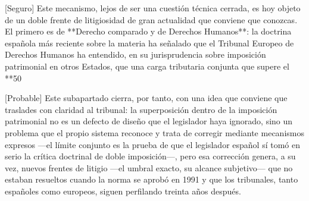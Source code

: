 \documentclass[10pt,a4paper]{article}
\begin{document}
[Seguro] Este mecanismo, lejos de ser una cuestión técnica cerrada, es hoy objeto de un doble frente de litigiosidad de gran actualidad que conviene que conozcas. El primero es de **Derecho comparado y de Derechos Humanos**: la doctrina española más reciente sobre la materia ha señalado que el Tribunal Europeo de Derechos Humanos ha entendido, en su jurisprudencia sobre imposición patrimonial en otros Estados, que una carga tributaria conjunta que supere el **50%

[Probable] Este subapartado cierra, por tanto, con una idea que conviene que traslades con claridad al tribunal: la superposición dentro de la imposición patrimonial no es un defecto de diseño que el legislador haya ignorado, sino un problema que el propio sistema reconoce y trata de corregir mediante mecanismos expresos —el límite conjunto es la prueba de que el legislador español sí tomó en serio la crítica doctrinal de doble imposición—, pero esa corrección genera, a su vez, nuevos frentes de litigio —el umbral exacto, su alcance subjetivo— que no estaban resueltos cuando la norma se aprobó en 1991 y que los tribunales, tanto españoles como europeos, siguen perfilando treinta años después.
\end{document}
